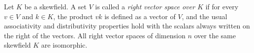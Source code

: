 Let $K$ be a skewfield. A set $V$ is called a \textit{right vector space over $K$} if for every $v \in V$ and $k \in K$, the product $vk$ is defined as a vector of $V$, and the usual associativity and distributivity properties hold with the scalars always written on the right of the vectors. All right vector spaces of dimension $n$ over the same skewfield $K$ are isomorphic.
